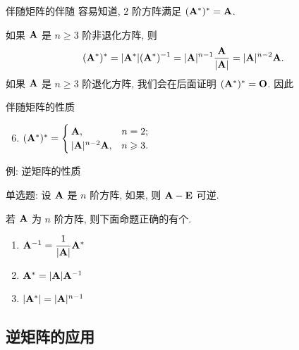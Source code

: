 \begin{frame}{伴随矩阵的伴随}
	\onslide<+->
	容易知道, $2$ 阶方阵满足 $({\mathbf{A}}^*)^*={\mathbf{A}}$.

	\onslide<+->
	如果 ${\mathbf{A}}$ 是 $n\ge3$ 阶非退化方阵, 则
	\[({\mathbf{A}}^*)^*=|{\mathbf{A}}^*|({\mathbf{A}}^*)^{-1}=|{\mathbf{A}}|^{n-1}\dfrac{{\mathbf{A}}}{|{\mathbf{A}}|}=|{\mathbf{A}}|^{n-2}{\mathbf{A}}.\]
	\onslide<+->
	如果 ${\mathbf{A}}$ 是 $n\ge3$ 阶退化方阵, 我们会在后面证明 $({\mathbf{A}}^*)^*={\mathbf{O}}$.
	\onslide<+->
	因此
	\begin{block}{伴随矩阵的性质}
		\begin{enumerate}
			\setcounter{enumi}{5}
			\item $({\mathbf{A}}^*)^*=\begin{cases}
				{\mathbf{A}},&n=2;\\
				|{\mathbf{A}}|^{n-2}{\mathbf{A}},&n\geqslant3.
			\end{cases}$
		\end{enumerate}
	\end{block}
\end{frame}


\begin{frame}{例: 逆矩阵的性质}
	\onslide<+->
	\begin{exercise}
		单选题: 设 ${\mathbf{A}}$ 是 $n$ 阶方阵, 如果, 则 ${\mathbf{A}}-{\mathbf{E}}$ 可逆.
	\end{exercise}
	\onslide<+->
	\begin{exercise}
		若 ${\mathbf{A}}$ 为 $n$ 阶方阵, 则下面命题正确的有\fillblank{\visible<+->{1}}个.
		\begin{enumerate}
			\item ${\mathbf{A}}^{-1}=\dfrac1{|{\mathbf{A}}|}{\mathbf{A}}^*$
			\item ${\mathbf{A}}^*=|{\mathbf{A}}|{\mathbf{A}}^{-1}$
			\item $|{\mathbf{A}}^*|=|{\mathbf{A}}|^{n-1}$
		\end{enumerate}
	\end{exercise}
\end{frame}


\subsection{逆矩阵的应用}

